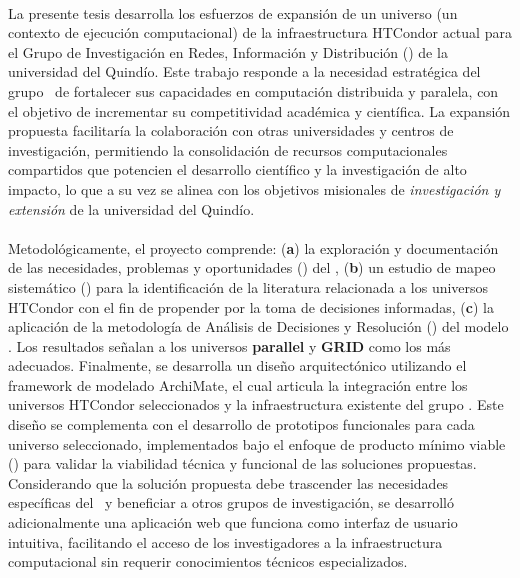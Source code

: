 \label{cap:resumen}
\mbox{}\\

La presente tesis desarrolla los esfuerzos de expansión de un universo (\ie un contexto de ejecución computacional) de la infraestructura HTCondor actual para el Grupo de Investigación en Redes, Información y Distribución (\GRID) de la universidad del Quindío. Este trabajo responde a la necesidad estratégica del grupo \GRID~de fortalecer sus capacidades en computación distribuida y paralela, con el objetivo de incrementar su competitividad académica y científica. La expansión propuesta facilitaría la colaboración con otras universidades y centros de investigación, permitiendo la consolidación de recursos computacionales compartidos que potencien el desarrollo científico y la investigación de alto impacto, lo que a su vez se alinea con los objetivos misionales de \textit{investigación y extensión} de la universidad del Quindío.
\\\\
Metodológicamente, el proyecto comprende: (\textbf{a}) la exploración y documentación de las necesidades, problemas y oportunidades (\NPO) del \GRID, (\textbf{b}) un estudio de mapeo sistemático (\SMS) para la identificación de la literatura relacionada a los universos HTCondor con el fin de propender por la toma de decisiones informadas, (\textbf{c}) la aplicación de la metodología de Análisis de Decisiones y Resolución (\DAR) del modelo \CMMI. Los resultados señalan a los universos \textbf{parallel} y \textbf{GRID} como los más adecuados. Finalmente, se desarrolla un diseño arquitectónico utilizando el framework de modelado ArchiMate, el cual articula la integración entre los universos HTCondor seleccionados y la infraestructura existente del grupo \GRID. Este diseño se complementa con el desarrollo de prototipos funcionales para cada universo seleccionado, implementados bajo el enfoque de producto mínimo viable (\PMV) para validar la viabilidad técnica y funcional de las soluciones propuestas. Considerando que la solución propuesta debe trascender las necesidades específicas del \GRID~y beneficiar a otros grupos de investigación, se desarrolló adicionalmente una aplicación web que funciona como interfaz de usuario intuitiva, facilitando el acceso de los investigadores a la infraestructura computacional sin requerir conocimientos técnicos especializados.






